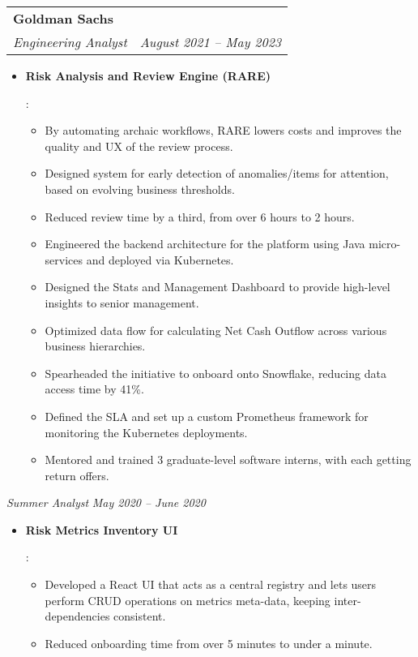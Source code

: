 \documentclass[letterpaper,11pt]{article}
\makeatletter
\newcommand{\resumeItem}[2]{
  \item\small{
    \textbf{#1}{: #2 \vspace{-2pt}}
  }
}
\newcommand{\resumeSubheading}[4]{
  \vspace{-1pt}\item
    \begin{tabular*}{0.97\textwidth}[t]{l@{\extracolsep{\fill}}r}
      \textbf{#1} & #2 \\
      \textit{\small#3} & \textit{\small #4} \\
    \end{tabular*}\vspace{-5pt}
}
\newcommand{\resumeSubSubHeading}[2]{\textit{\small #1} \hfill \textit{\small #2} }
\newcommand{\resumeItemListStart}{\begin{itemize}}
\newcommand{\resumeItemListEnd}{\end{itemize}\vspace{-5pt}}
\makeatother
\begin{document}
    \resumeSubheading
    {Goldman Sachs}{}
    {Engineering Analyst}{August 2021 -- May 2023}
    \resumeItemListStart
    \resumeItem{Risk Analysis and Review Engine (RARE)}
        {
        \begin{itemize}
        \item By automating archaic workflows, RARE lowers costs and improves the quality and UX of the review process.
        \item Designed system for early detection of anomalies/items for attention, based on evolving business thresholds.
        \item Reduced review time by a third, from over 6 hours to 2 hours.
        \item Engineered the backend architecture for the platform using  Java micro-services and deployed via Kubernetes.
        \item Designed the Stats and Management Dashboard to provide high-level insights to senior management.
        \item Optimized data flow for calculating Net Cash Outflow across various business hierarchies.
        \item Spearheaded the initiative to onboard onto Snowflake, reducing data access time by 41\%. 
        \item Defined the SLA and set up a custom Prometheus framework for monitoring the Kubernetes deployments.
        \item Mentored and trained 3 graduate-level software interns, with each getting return offers. 
        \end{itemize}
        }
    \resumeItemListEnd
    
    \resumeSubSubHeading {Summer Analyst}{May 2020 -- June 2020}
    \resumeItemListStart
    \resumeItem{Risk Metrics Inventory UI}
        {
          \begin{itemize}
          \item Developed a React UI that acts as a central registry and lets users perform CRUD operations on metrics meta-data, keeping inter-dependencies consistent.
          \item Reduced onboarding time from over 5 minutes to under a minute.
          \end{itemize}
        }
    \resumeItemListEnd
\end{document}
